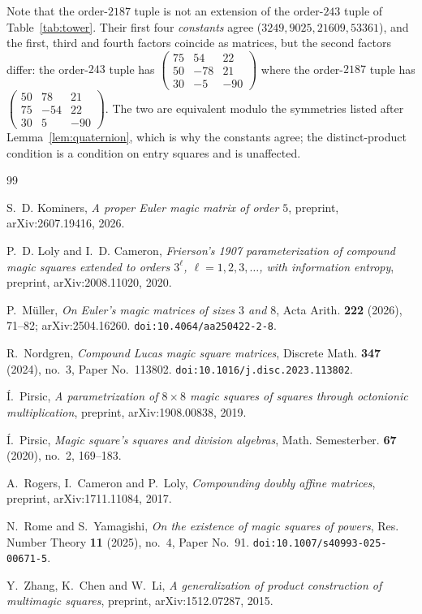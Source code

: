 \documentclass[11pt,a4paper]{amsart}
\theoremstyle{plain}
\theoremstyle{definition}
\theoremstyle{remark}
\begin{document}
Note that the order-$2187$ tuple is not an extension of the order-$243$ tuple of
Table~\ref{tab:tower}. Their first four \emph{constants} agree
($3249,9025,21609,53361$), and the first, third and fourth factors coincide as
matrices, but the second factors differ: the order-$243$ tuple has
$\left(\begin{smallmatrix}75&54&22\\50&-78&21\\30&-5&-90\end{smallmatrix}\right)$
where the order-$2187$ tuple has
$\left(\begin{smallmatrix}50&78&21\\75&-54&22\\30&5&-90\end{smallmatrix}\right)$.
The two are equivalent modulo the symmetries listed after
Lemma~\ref{lem:quaternion}, which is why the constants agree; the
distinct-product condition is a condition on entry squares and is unaffected.

\begin{thebibliography}{99}

S.~D. Kominers, \emph{A proper Euler magic matrix of order $5$}, preprint,
arXiv:2607.19416, 2026.

P.~D. Loly and I.~D. Cameron, \emph{Frierson's 1907 parameterization of compound
magic squares extended to orders $3^{\ell}$, $\ell=1,2,3,\dots$, with
information entropy}, preprint, arXiv:2008.11020, 2020.

P.~Müller, \emph{On Euler's magic matrices of sizes $3$ and $8$},
Acta Arith. \textbf{222} (2026), 71--82; arXiv:2504.16260.
\texttt{doi:10.4064/aa250422-2-8}.

R.~Nordgren, \emph{Compound Lucas magic square matrices}, Discrete Math.
\textbf{347} (2024), no.~3, Paper No.~113802.
\texttt{doi:10.1016/j.disc.2023.113802}.

Í.~Pirsic, \emph{A parametrization of $8\times8$ magic squares of squares
through octonionic multiplication}, preprint, arXiv:1908.00838, 2019.

Í.~Pirsic, \emph{Magic square's squares and division algebras},
Math. Semesterber. \textbf{67} (2020), no.~2, 169--183.

A.~Rogers, I.~Cameron and P.~Loly, \emph{Compounding doubly affine matrices},
preprint, arXiv:1711.11084, 2017.

N.~Rome and S.~Yamagishi, \emph{On the existence of magic squares of powers},
Res. Number Theory \textbf{11} (2025), no.~4, Paper No.~91.
\texttt{doi:10.1007/s40993-025-00671-5}.

Y.~Zhang, K.~Chen and W.~Li, \emph{A generalization of product construction of
multimagic squares}, preprint, arXiv:1512.07287, 2015.

\end{thebibliography}
\end{document}
